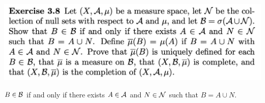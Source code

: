 \newpage
\begin{mdframed}
\includegraphics[width=400pt]{img/analysis--berkeley-202a-hw04-c88b.png}
\end{mdframed}

\begin{claim*}\label{claim-3-8-1}
  $B \in \mathcal B$ if and only if there exists $A \in \mathcal A$ and $N \in \mathcal N$ such that $B = A \cup N$.
\end{claim*}

